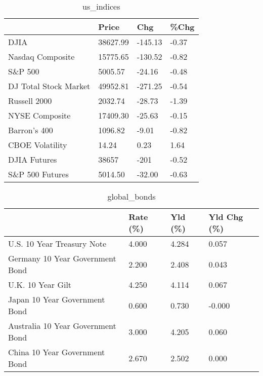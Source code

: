 \documentclass{article}%
\begin{document}
%


\begin{table}[htbp]%
\caption{us\_indices}%
\centering%
\begin{adjustbox}{width=1\textwidth}%
\begin{tabular}{llll}
\toprule
                      &    Price &     Chg &  \%Chg \\
\midrule
                 DJIA & 38627.99 & -145.13 & -0.37 \\
     Nasdaq Composite & 15775.65 & -130.52 & -0.82 \\
              S\&P 500 &  5005.57 &  -24.16 & -0.48 \\
DJ Total Stock Market & 49952.81 & -271.25 & -0.54 \\
         Russell 2000 &  2032.74 &  -28.73 & -1.39 \\
       NYSE Composite & 17409.30 &  -25.63 & -0.15 \\
         Barron's 400 &  1096.82 &   -9.01 & -0.82 \\
      CBOE Volatility &    14.24 &    0.23 &  1.64 \\
         DJIA Futures &    38657 &    -201 & -0.52 \\
      S\&P 500 Futures &  5014.50 &  -32.00 & -0.63 \\
\bottomrule
\end{tabular}
%
\end{adjustbox}%
\end{table}

%


\begin{table}[htbp]%
\caption{global\_bonds}%
\centering%
\begin{adjustbox}{width=1\textwidth}%
\begin{tabular}{llll}
\toprule
                                  & Rate (\%) & Yld (\%) & Yld Chg (\%) \\
\midrule
       U.S. 10 Year Treasury Note &    4.000 &   4.284 &       0.057 \\
  Germany 10 Year Government Bond &    2.200 &   2.408 &       0.043 \\
                U.K. 10 Year Gilt &    4.250 &   4.114 &       0.067 \\
    Japan 10 Year Government Bond &    0.600 &   0.730 &      -0.000 \\
Australia 10 Year Government Bond &    3.000 &   4.205 &       0.060 \\
    China 10 Year Government Bond &    2.670 &   2.502 &       0.000 \\
\bottomrule
\end{tabular}
%
\end{adjustbox}%
\end{table}
\end{document}
